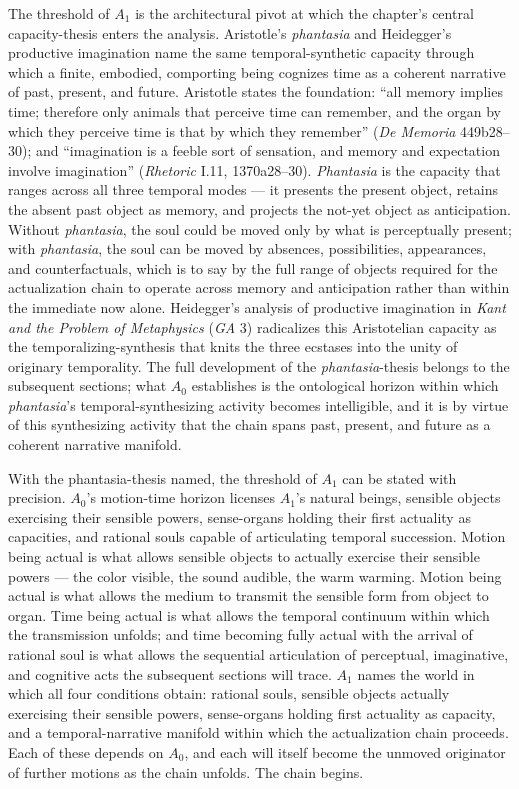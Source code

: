 The threshold of $A_1$ is the architectural pivot at which the chapter's central capacity-thesis enters the analysis. Aristotle's \textit{phantasia} and Heidegger's productive imagination name the same temporal-synthetic capacity through which a finite, embodied, comporting being cognizes time as a coherent narrative of past, present, and future. Aristotle states the foundation: ``all memory implies time; therefore only animals that perceive time can remember, and the organ by which they perceive time is that by which they remember'' (\textit{De Memoria} 449b28--30); and ``imagination is a feeble sort of sensation, and memory and expectation involve imagination'' (\textit{Rhetoric} I.11, 1370a28--30). \textit{Phantasia} is the capacity that ranges across all three temporal modes --- it presents the present object, retains the absent past object as memory, and projects the not-yet object as anticipation. Without \textit{phantasia}, the soul could be moved only by what is perceptually present; with \textit{phantasia}, the soul can be moved by absences, possibilities, appearances, and counterfactuals, which is to say by the full range of objects required for the actualization chain to operate across memory and anticipation rather than within the immediate now alone. Heidegger's analysis of productive imagination in \textit{Kant and the Problem of Metaphysics} (\textit{GA} 3) radicalizes this Aristotelian capacity as the temporalizing-synthesis that knits the three ecstases into the unity of originary temporality. The full development of the \textit{phantasia}-thesis belongs to the subsequent sections; what $A_0$ establishes is the ontological horizon within which \textit{phantasia}'s temporal-synthesizing activity becomes intelligible, and it is by virtue of this synthesizing activity that the chain spans past, present, and future as a coherent narrative manifold.

With the phantasia-thesis named, the threshold of $A_1$ can be stated with precision. $A_0$'s motion-time horizon licenses $A_1$'s natural beings, sensible objects exercising their sensible powers, sense-organs holding their first actuality as capacities, and rational souls capable of articulating temporal succession. Motion being actual is what allows sensible objects to actually exercise their sensible powers --- the color visible, the sound audible, the warm warming. Motion being actual is what allows the medium to transmit the sensible form from object to organ. Time being actual is what allows the temporal continuum within which the transmission unfolds; and time becoming fully actual with the arrival of rational soul is what allows the sequential articulation of perceptual, imaginative, and cognitive acts the subsequent sections will trace. $A_1$ names the world in which all four conditions obtain: rational souls, sensible objects actually exercising their sensible powers, sense-organs holding first actuality as capacity, and a temporal-narrative manifold within which the actualization chain proceeds. Each of these depends on $A_0$, and each will itself become the unmoved originator of further motions as the chain unfolds. The chain begins.

